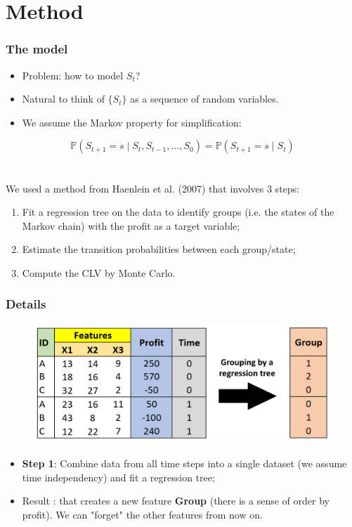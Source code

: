 \documentclass[aspectratio=169,xcolor=x11names,compress]{beamer}
\newcommand{\Prob}{\mathbb{P}}
\begin{document}
\section{Method}

\begin{frame}
\frametitle{The model}

\begin{itemize}
	\item Problem: how to model $S_t$?
	\item Natural to think of $\{S_t\}$ as a sequence of random variables.
	\item We assume the Markov property for simplification:
\end{itemize}
\[ \Prob(S_{t+1} = s \mid S_t, S_{t-1}, \dots, S_0) = \Prob(S_{t+1} = s \mid S_t) \]
\\~\\
We used a method from Haenlein et al. (2007) that involves 3 steps:

\begin{enumerate}
	\item Fit a regression tree on the data to identify groups (i.e. the states of the Markov chain) with the profit as a target variable;
	\item Estimate the transition probabilities between each group/state;
	\item Compute the CLV by Monte Carlo.
\end{enumerate}

\end{frame}


\begin{frame}
\frametitle{Details}

\begin{figure}
	\includegraphics[scale = 0.3]{tree_result.jpg}
\end{figure}
	
\begin{itemize}
	\item \textbf{Step 1}: Combine data from all time steps into a single dataset (we assume time independency) and fit a regression tree;
	\item Result : that creates a new feature \textbf{Group} (there is a sense of order by profit). We can "forget" the other features from now on. 
\end{itemize}
\end{frame}
\end{document}
